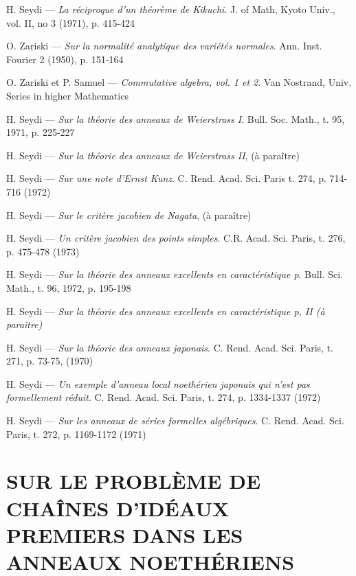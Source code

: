 {\begin{thebibliography}{99}
  {\sc H. Seydi} ---
  {\it La réciproque d’un théorème de Kikuchi}. J. of Math, Kyoto Univ., vol. II, no 3 (1971), p. 415-424

  {\sc O. Zariski} ---
  {\it Sur la normalité analytique des variétés normales}. Ann. Inst. Fourier 2 (1950), p. 151-164

  {\sc O. Zariski et P. Samuel} ---
  {\it Commutative algebra, vol. 1 et 2}. Van Nostrand, Univ. Series in higher Mathematics

  {\sc H. Seydi} ---
  {\it Sur la théorie des anneaux de Weierstrass I}. Bull. Soc. Math., t. 95, 1971, p. 225-227

  {\sc H. Seydi} ---
  {\it Sur la théorie des anneaux de Weierstrass II}, (à paraître)

  {\sc H. Seydi} ---
  {\it Sur une note d’Ernst Kunz}. C. Rend. Acad. Sci. Paris t. 274, p. 714-716 (1972)

  {\sc H. Seydi} ---
  {\it Sur le critère jacobien de Nagata}, (à paraître)

  {\sc H. Seydi} ---
  {\it Un critère jacobien des points simples}. C.R. Acad. Sci. Paris, t. 276, p. 475-478 (1973)

  {\sc H. Seydi} ---
  {\it Sur la théorie des anneaux excellents en caractéristique p}. Bull. Sci. Math., t. 96, 1972, p. 195-198

  {\sc H. Seydi} ---
  {\it Sur la théorie des anneaux excellents en caractéristique p, II (à paraître)}

  {\sc H. Seydi} ---
  {\it Sur la théorie des anneaux japonais}. C. Rend. Acad. Sci. Paris, t. 271, p. 73-75, (1970)

  {\sc H. Seydi} ---
  {\it Un exemple d’anneau local noethérien japonais qui n’est pas formellement réduit}. C. Rend. Acad. Sci. Paris, t. 274, p. 1334-1337 (1972)

  {\sc H. Seydi} ---
  {\it Sur les anneaux de séries formelles algébriques}. C. Rend. Acad. Sci. Paris, t. 272, p. 1169-1172 (1971)

\end{thebibliography}

\chapter*{SUR LE PROBLÈME DE CHAÎNES D’IDÉAUX PREMIERS DANS LES ANNEAUX NOETHÉRIENS}\thispagestyle{empty}
\label{sec:b}
}
